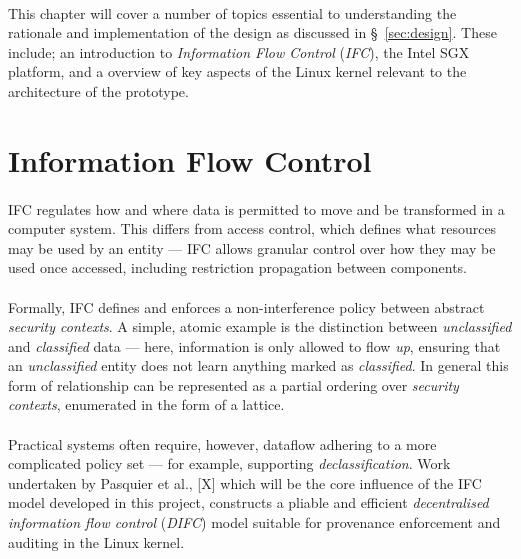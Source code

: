 
\paragraph{} This chapter will cover a number of topics essential to understanding the rationale and implementation of the design as discussed in §~\ref{sec:design}. These include; an introduction to \textit{Information Flow Control} (\textit{IFC}), the Intel SGX platform, and a overview of key aspects of the Linux kernel relevant to the architecture of the prototype.



\section{Information Flow Control}

\paragraph{} IFC regulates how and where data is permitted to move and be transformed in a computer system. This differs from access control, which defines what resources may be used by an entity --- IFC allows granular control over how they may be used once accessed, including restriction propagation between components. 

\paragraph{} Formally, IFC defines and enforces a non-interference policy between abstract \textit{security contexts}. A simple, atomic example is the distinction between \textit{unclassified} and \textit{classified} data --- here, information is only allowed to flow \textit{up}, ensuring that an \textit{unclassified} entity does not learn anything marked as \textit{classified}. In general this form of relationship can be represented as a partial ordering over \textit{security contexts}, enumerated in the form of a lattice.

\paragraph{} Practical systems often require, however, dataflow adhering to a more complicated policy set --- for example, supporting \textit{declassification}. Work undertaken by Pasquier et al., [X] which will be the core influence of the IFC model developed in this project, constructs a pliable and efficient \textit{decentralised information flow control} (\textit{DIFC}) model suitable for provenance enforcement and auditing in the Linux kernel.

